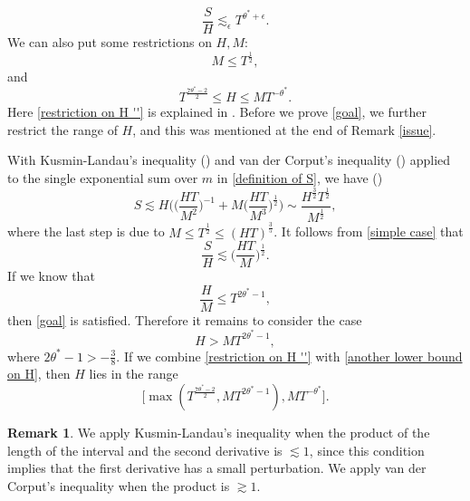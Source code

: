\documentclass[11pt]{amsart}
\numberwithin{equation}{section}
\theoremstyle{definition}
\newtheorem{remark}[theorem]{Remark}
\theoremstyle{proposition}
\begin{document}
\begin{equation}  \label{goal}
\frac{S}{H}\lesssim_\epsilon T^{\theta^*+\epsilon}.  
\end{equation}
We can also put some restrictions on $H,M$:
\begin{equation}   \label{restriction on M}
M  \le T^{\frac{1}{2}},    
\end{equation}
and 
\begin{equation}  \label{restriction on H ''} 
T^{\frac{7\theta^*-2}{2}} \le H\le  MT^{-\theta^*}.
\end{equation}
Here \eqref{restriction on H ''}  is explained in \cite[(7.6)]{BourgainWatt2nd}. Before we prove \eqref{goal}, we further restrict the range of $H$, and this was mentioned at the end of Remark \ref{issue}.

With Kusmin-Landau's inequality (\cite[Thm 2.1]{GrahamKolesnik1991}) and van der Corput's inequality (\cite[Thm 2.2]{GrahamKolesnik1991}) applied to the single exponential sum over $m$ in \eqref{definition of S}, we have (\cite[(6.9)]{BourgainWatt2nd})
\begin{equation}  \label{simple case}
S \lesssim H\Big(\Big(\frac{HT}{M^2}\Big)^{-1}+ M\Big(\frac{HT}{M^3}\Big)^{\frac{1}{2}}\Big) \sim \frac{H^{\frac{3}{2}}T^{\frac{1}{2}}}{M^{\frac{1}{2}}},    
\end{equation}
where the last step is due to $M \le T^{\frac{1}{2}}\le (HT)^{\frac{3}{5}}$. It follows from \eqref{simple case} that 
\[
\frac{S}{H} \lesssim \Big(\frac{HT}{M} \Big)^{\frac{1}{2}}.
\]
If we know that 
\[
\frac{H}{M}\le T^{2\theta^*-1},
\]
then \eqref{goal} is satisfied. Therefore it remains to consider the case 
\begin{equation}  \label{another lower bound on H}
H > MT^{2\theta^*-1},   
\end{equation}
where $2\theta^*-1> -\frac{3}{8}$. If we combine \eqref{restriction on H ''} with \eqref{another lower bound on H}, then $H$ lies in the range 
\begin{equation}   \label{restriction on H}
\Big[\max(T^{\frac{7\theta^*-2}{2}},MT^{2\theta^*-1}),  MT^{-\theta^*}\Big].     
\end{equation}
\begin{remark}
We apply Kusmin-Landau's inequality when the product of the length of the interval and the second derivative is $\lesssim 1$, since this condition implies that the first derivative has a small perturbation. We apply van der Corput's inequality when the product is $\gtrsim 1$. 
\end{remark} 
\end{document}
